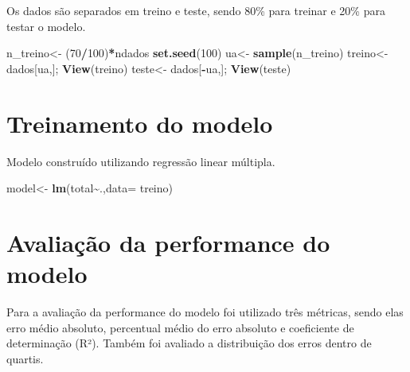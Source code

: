 \documentclass[
]{article}
\newenvironment{Shaded}{\begin{snugshade}}{\end{snugshade}}
\newcommand{\DataTypeTok}[1]{\textcolor[rgb]{0.13,0.29,0.53}{#1}}
\newcommand{\DecValTok}[1]{\textcolor[rgb]{0.00,0.00,0.81}{#1}}
\newcommand{\KeywordTok}[1]{\textcolor[rgb]{0.13,0.29,0.53}{\textbf{#1}}}
\newcommand{\NormalTok}[1]{#1}
\newcommand{\OperatorTok}[1]{\textcolor[rgb]{0.81,0.36,0.00}{\textbf{#1}}}
\newcommand{\StringTok}[1]{\textcolor[rgb]{0.31,0.60,0.02}{#1}}
\begin{document}
Os dados são separados em treino e teste, sendo 80\% para treinar e 20\%
para testar o modelo.

\begin{Shaded}
\begin{Highlighting}[]
\NormalTok{n\_treino\textless{}{-}}\StringTok{ }\NormalTok{(}\DecValTok{70}\OperatorTok{/}\DecValTok{100}\NormalTok{)}\OperatorTok{*}\NormalTok{ndados}
\KeywordTok{set.seed}\NormalTok{(}\DecValTok{100}\NormalTok{)}
\NormalTok{ua\textless{}{-}}\StringTok{ }\KeywordTok{sample}\NormalTok{(n\_treino)}
\NormalTok{treino\textless{}{-}}\StringTok{ }\NormalTok{dados[ua,]; }\KeywordTok{View}\NormalTok{(treino)}
\NormalTok{teste\textless{}{-}}\StringTok{ }\NormalTok{dados[}\OperatorTok{{-}}\NormalTok{ua,]; }\KeywordTok{View}\NormalTok{(teste)}
\end{Highlighting}
\end{Shaded}

\hypertarget{treinamento-do-modelo}{%
\section{Treinamento do modelo}\label{treinamento-do-modelo}}

Modelo construído utilizando regressão linear múltipla.

\begin{Shaded}
\begin{Highlighting}[]
\NormalTok{model\textless{}{-}}\StringTok{ }\KeywordTok{lm}\NormalTok{(total}\OperatorTok{\textasciitilde{}}\NormalTok{.,}\DataTypeTok{data=}\NormalTok{ treino)}
\end{Highlighting}
\end{Shaded}

\hypertarget{avaliauxe7uxe3o-da-performance-do-modelo}{%
\section{Avaliação da performance do
modelo}\label{avaliauxe7uxe3o-da-performance-do-modelo}}

Para a avaliação da performance do modelo foi utilizado três métricas,
sendo elas erro médio absoluto, percentual médio do erro absoluto e
coeficiente de determinação (R²). Também foi avaliado a distribuição dos
erros dentro de quartis.
\end{document}

